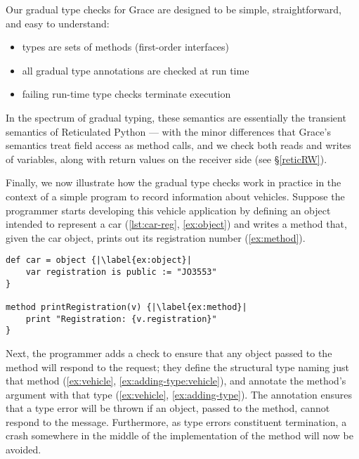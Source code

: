 Our gradual type checks for Grace are designed to be simple,
straightforward, and easy to understand:
\begin{itemize}
  \item types are sets of methods (first-order interfaces)
  \item all gradual type annotations are checked at run time
  \item failing run-time type checks terminate execution
\end{itemize}
%
%
In the spectrum of gradual typing, these semantics are essentially the
transient semantics of Reticulated Python
\cite{reticPython2014,Greenman2018} ---
with the minor differences that Grace's semantics
treat field access as method calls, and we check both reads and
writes of variables, along with return values on the receiver side
(see \S\ref{reticRW}).


Finally,
we now illustrate how the gradual type checks work in practice
in the context of a simple program to record information about vehicles.
Suppose the programmer starts developing this vehicle
application by defining an object intended to represent a car
(\cref{lst:car-reg}, \cref{ex:object}) and writes a method that, given
the car object, prints out its registration number (\cref{ex:method}).

\begin{lstlisting}[caption={The start of a simple program for tracking vehicle information.},float,label=lst:car-reg,escapechar=|,columns=flexible,float,floatplacement=H]
def car = object {|\label{ex:object}|
    var registration is public := "JO3553"
}

method printRegistration(v) {|\label{ex:method}|
    print "Registration: {v.registration}"
}
\end{lstlisting}

Next, the programmer adds a check to ensure that any object passed to the
 method will respond to the
 request; 
they define the structural type \citep{theCleanVehicle}
naming just that method (\cref{ex:vehicle}, \cref{ex:adding-type:vehicle}), 
and annotate the  method's
argument with that type (\cref{ex:vehicle}, \cref{ex:adding-type}).
The annotation ensures that a type error will be thrown if an object,
passed to the  method,
cannot respond to the  message.
Furthermore, as type errors constituent termination, 
a crash somewhere in the middle of the
implementation of the  method
will now be avoided.

